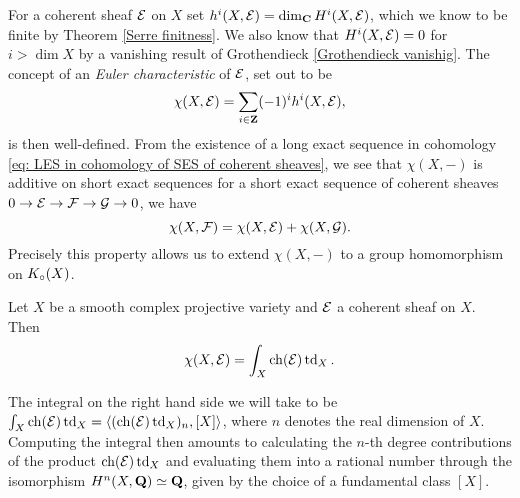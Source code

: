 For a coherent sheaf $\mathcal E$ on $X$ set $h^i(X, \mathcal E) = \dim_\mathbf C H^i(X, \mathcal E)$, which we know to be finite by Theorem \ref{Serre finitness}. We also know that $H^{i}(X, \mathcal E) = 0$ for $i > \dim X$ by a vanishing result of Grothendieck \ref{Grothendieck vanishig}.
The concept of an \emph{Euler characteristic} of $\mathcal E$, set out to be
\[
    \chi(X, \mathcal E) = \sum_{i \in \mathbf Z} (-1)^i h^i(X, \mathcal E),
\] 
is then well-defined. From the existence of a long exact sequence in cohomology \eqref{eq: LES in cohomology of SES of coherent sheaves}, we see that $\chi(X, -)$ is additive on short exact sequences \ie for a short exact sequence of coherent sheaves $0 \to \mathcal E \to \mathcal F \to \mathcal G \to 0$, we have
\[
    \chi(X, \mathcal F) = \chi(X, \mathcal E) + \chi(X, \mathcal G).
\]
Precisely this property allows us to extend $\chi(X,-)$ to a group homomorphism on $K_{\circ}(X)$.
\begin{theorem}
    \label{Hirzebruch-Riemann-Roch}
    Let $X$ be a smooth complex projective variety and $\mathcal E$ a coherent sheaf on $X$. Then
    \begin{equation}
        \label{eq: Hirzebruch-Riemann-Roch formula}
        \chi(X, \E) = \int_X \ch{\E}\tdclass{X}.
    \end{equation}
\end{theorem}


\begin{remark}
    The integral on the right hand side we will take to be $\int_X \ch{\E}\tdclass{X} = \pairing{(\ch{\E}\tdclass{X})_n}{[X]}$, where $n$ denotes the real dimension of $X$. 
    Computing the integral then amounts to calculating the $n$-th degree contributions of the product $\ch{\E}\tdclass{X}$ and evaluating them into a rational number through the isomorphism $H^{n}(X, \mathbf Q) \simeq \mathbf Q$, given by the choice of a fundamental class $[X]$.
\end{remark}

